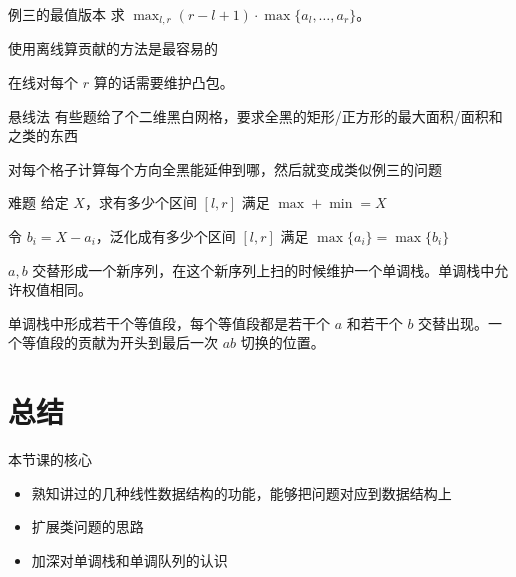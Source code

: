 \documentclass[11pt,aspectratio=169]{beamer}
\begin{document}
\begin{frame}{例三的最值版本}
    求 $\max_{l,r}(r-l+1)\cdot\max\{a_l,\ldots,a_r\}$。

    使用离线算贡献的方法是最容易的

    在线对每个 $r$ 算的话需要维护凸包。
\end{frame}
\begin{frame}{悬线法}
    有些题给了个二维黑白网格，要求全黑的矩形/正方形的最大面积/面积和之类的东西

    对每个格子计算每个方向全黑能延伸到哪，然后就变成类似例三的问题
\end{frame}
\begin{frame}{难题}
    给定 $X$，求有多少个区间 $[l,r]$ 满足 $\max+\min=X$

    令 $b_i=X-a_i$，泛化成有多少个区间 $[l,r]$ 满足 $\max\{a_i\}=\max\{b_i\}$

    $a,b$ 交替形成一个新序列，在这个新序列上扫的时候维护一个单调栈。单调栈中允许权值相同。

    单调栈中形成若干个等值段，每个等值段都是若干个 $a$ 和若干个 $b$ 交替出现。一个等值段的贡献为开头到最后一次 $ab$ 切换的位置。
\end{frame}




\section{总结}

\begin{frame}{本节课的核心}
\begin{itemize}
    \item 熟知讲过的几种线性数据结构的功能，能够把问题对应到数据结构上
    \item 扩展类问题的思路
    \item 加深对单调栈和单调队列的认识
\end{itemize}
\end{frame}
\end{document}
